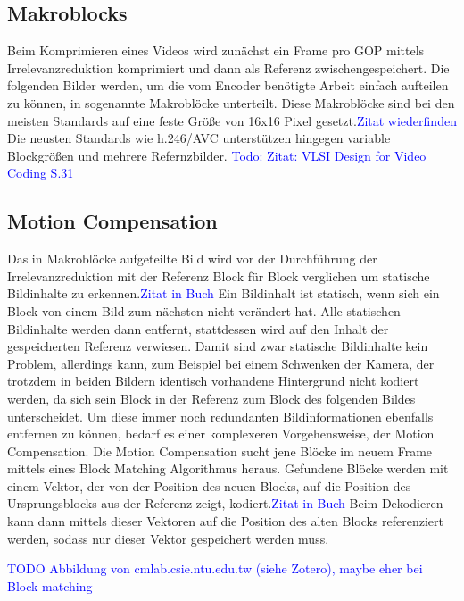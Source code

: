 \subsection{Makroblocks}

Beim Komprimieren eines Videos wird zunächst ein Frame pro GOP mittels Irrelevanzreduktion komprimiert und dann als Referenz zwischengespeichert. Die folgenden Bilder werden, um die vom Encoder benötigte Arbeit einfach aufteilen zu können, in sogenannte Makroblöcke unterteilt. Diese Makroblöcke sind bei den meisten Standards auf eine feste Größe von 16x16 Pixel gesetzt.\textcolor{blue}{Zitat wiederfinden} Die neusten Standards wie h.246/AVC unterstützen hingegen variable Blockgrößen und mehrere Refernzbilder. \textcolor{blue}{Todo: Zitat: VLSI Design for Video Coding S.31} 

\subsection{Motion Compensation}

Das in Makroblöcke aufgeteilte Bild wird vor der Durchführung der Irrelevanzreduktion mit der Referenz Block für Block verglichen um statische Bildinhalte zu erkennen.\textcolor{blue}{Zitat in Buch} Ein Bildinhalt ist statisch, wenn sich ein Block von einem Bild zum nächsten nicht verändert hat. Alle statischen Bildinhalte werden dann entfernt, stattdessen wird auf den Inhalt der gespeicherten Referenz verwiesen. 
Damit sind zwar statische Bildinhalte kein Problem, allerdings kann, zum Beispiel bei einem Schwenken der Kamera, der trotzdem in beiden Bildern identisch vorhandene Hintergrund nicht kodiert werden, da sich sein Block in der Referenz zum Block des folgenden Bildes unterscheidet. Um diese immer noch redundanten Bildinformationen ebenfalls entfernen zu können, bedarf es einer komplexeren Vorgehensweise, der Motion Compensation.
Die Motion Compensation sucht jene Blöcke im neuem Frame mittels eines Block Matching Algorithmus heraus. Gefundene Blöcke werden mit einem Vektor, der von der Position des neuen Blocks, auf die Position des Ursprungsblocks aus der Referenz zeigt, kodiert.\textcolor{blue}{Zitat in Buch} Beim Dekodieren kann dann mittels dieser Vektoren auf die Position des alten Blocks referenziert werden, sodass nur dieser Vektor gespeichert werden muss.

\textcolor{blue}{TODO Abbildung von cmlab.csie.ntu.edu.tw (siehe Zotero), maybe eher bei Block matching}



